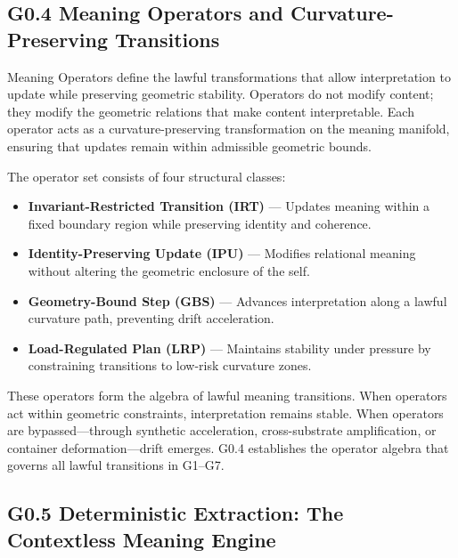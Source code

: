 \subsection*{G0.4 Meaning Operators and Curvature-Preserving Transitions}
\medskip

\noindent Meaning Operators define the lawful transformations that allow
interpretation to update while preserving geometric stability. Operators do not
modify content; they modify the geometric relations that make content
interpretable. Each operator acts as a curvature-preserving transformation on
the meaning manifold, ensuring that updates remain within admissible geometric
bounds.

\medskip

\noindent The operator set consists of four structural classes:

\begin{itemize}[leftmargin=1.2cm]
    \item \textbf{Invariant-Restricted Transition (IRT)} — Updates meaning
    within a fixed boundary region while preserving identity and coherence.

    \item \textbf{Identity-Preserving Update (IPU)} — Modifies relational
    meaning without altering the geometric enclosure of the self.

    \item \textbf{Geometry-Bound Step (GBS)} — Advances interpretation along a
    lawful curvature path, preventing drift acceleration.

    \item \textbf{Load-Regulated Plan (LRP)} — Maintains stability under
    pressure by constraining transitions to low-risk curvature zones.
\end{itemize}

\medskip

\noindent These operators form the algebra of lawful meaning transitions. When
operators act within geometric constraints, interpretation remains stable. When
operators are bypassed—through synthetic acceleration, cross-substrate
amplification, or container deformation—drift emerges. G0.4 establishes the
operator algebra that governs all lawful transitions in G1--G7.

\medskip

\subsection*{G0.5 Deterministic Extraction: The Contextless Meaning Engine}
\medskip

